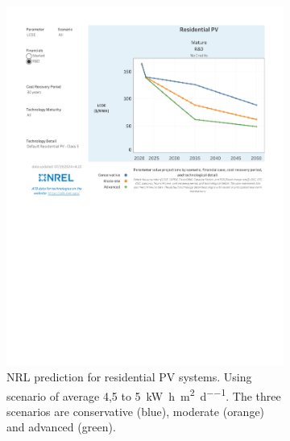 \begin{figure}[H]
    \centering
    \begin{subfigure}[b]{0.48\textwidth}
        \centering
        \includegraphics[width=\textwidth]{photos/LCOE_ResidentialPV_NRL.pdf}
        \caption{NRL prediction for residential PV systems. Using scenario of average 4,5 to \SI{5}{\kilo\watt\hour\per\square\meter\per\day}. The three scenarios are conservative (blue), moderate (orange) and advanced (green).}
    \end{subfigure}
    \hfill
    \begin{subfigure}[b]{0.48\textwidth}
        \centering

\end{subfigure}
\end{figure}

